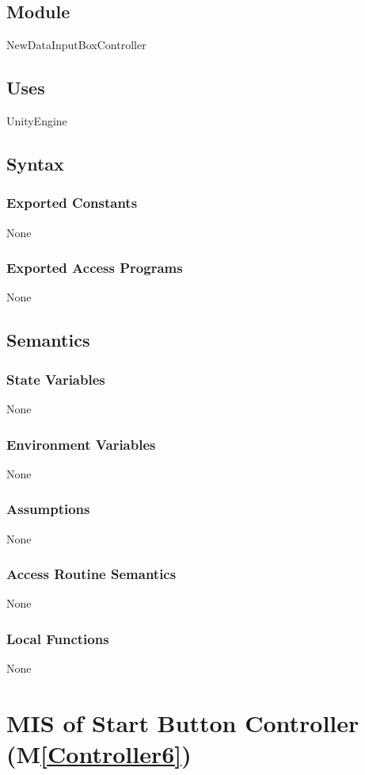\documentclass[12pt, titlepage]{article}
\newcommand{\mref}[1]{M\ref{#1}}
\begin{document}
\subsection{Module}
NewDataInputBoxController
\subsection{Uses}
UnityEngine
\subsection{Syntax}

\subsubsection{Exported Constants}
None

\subsubsection{Exported Access Programs}
None

\subsection{Semantics}

\subsubsection{State Variables}
None

\subsubsection{Environment Variables}
None

\subsubsection{Assumptions}
None

\subsubsection{Access Routine Semantics}
None
\subsubsection{Local Functions}
None
\newpage

\section{MIS of Start Button Controller (\mref{Controller6})} 
\end{document}
